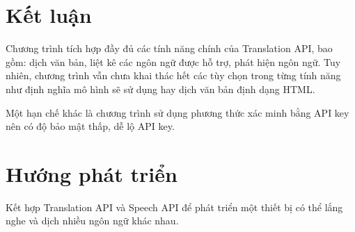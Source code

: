 \documentclass[../thesis.tex]{subfiles}
\begin{document}
\section{Kết luận}

Chương trình tích hợp đầy đủ các tính năng chính của Translation API, bao gồm: dịch văn bản, liệt kê các ngôn ngữ được hỗ trợ, phát hiện ngôn ngữ. Tuy nhiên, chương trình vẫn chưa khai thác hết các tùy chọn trong từng tính năng như định nghĩa mô hình sẽ sử dụng hay dịch văn bản định dạng HTML.

Một hạn chế khác là chương trình sử dụng phương thức xác minh bằng API key nên có độ bảo mật thấp, dễ lộ API key.

\section{Hướng phát triển}

Kết hợp Translation API và Speech API để phát triển một thiết bị có thể lắng nghe và dịch nhiều ngôn ngữ khác nhau.
\end{document}
